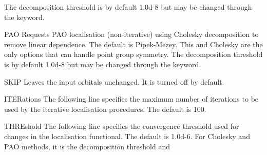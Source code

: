 \begin{keywordlist}
The decomposition threshold is by default 1.0d-8 but may be changed
through the  keyword.
\item[PAO]
Requests PAO localisation (non-iterative) using Cholesky decomposition
to remove linear dependence.
The default is Pipek-Mezey.
This and Cholesky are the only options that can handle point group symmetry.
The decomposition threshold is by default 1.0d-8 but may be changed
through the  keyword.
\item[SKIP]
Leaves the input orbitals unchanged. It is turned off by default.
%
%
\item[ITERations]
The following line specifies the maximum number of iterations to be
used by the iterative localisation procedures. The default is 100.
\item[THREshold]
The following line specifies the convergence threshold used for
changes in the localisation functional. The default is 1.0d-6.
For Cholesky and PAO methods, it is the decomposition threshold and

\end{keywordlist}
